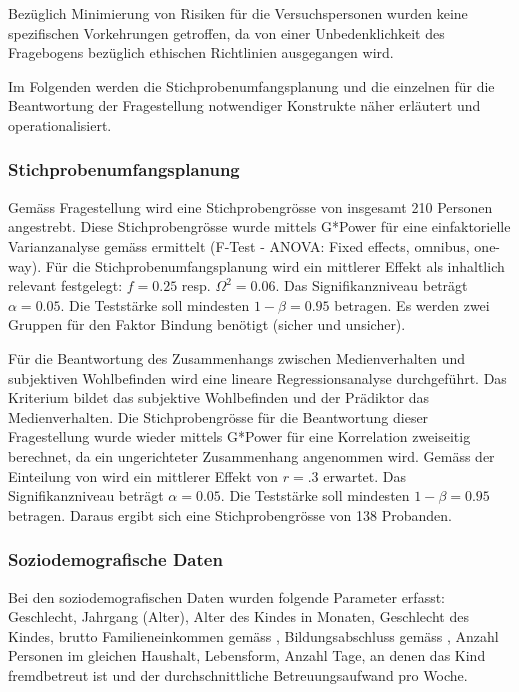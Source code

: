 Bezüglich Minimierung von Risiken für die Versuchspersonen wurden keine spezifischen Vorkehrungen getroffen, da von einer Unbedenklichkeit des Fragebogens bezüglich ethischen Richtlinien ausgegangen wird.

Im Folgenden werden die Stichprobenumfangsplanung und die einzelnen für die Beantwortung der Fragestellung notwendiger Konstrukte näher erläutert und operationalisiert.

\subsubsection{Stichprobenumfangsplanung}\label{sec:Stichprobenumfangsplanung}
Gemäss Fragestellung wird eine Stichprobengrösse von insgesamt 210 Personen angestrebt. Diese Stichprobengrösse wurde mittels G*Power \cite{Faul2009} für eine einfaktorielle Varianzanalyse gemäss  ermittelt (F-Test - ANOVA: Fixed effects, omnibus, one-way).
Für die Stichprobenumfangsplanung wird ein mittlerer Effekt \cite{Cohen1988a} als inhaltlich relevant festgelegt: $f = 0.25$ resp. $\Omega^2 = 0.06$. Das Signifikanzniveau beträgt $\alpha=0.05$. Die Teststärke soll mindesten $1-\beta=0.95$ betragen. Es werden zwei Gruppen für den Faktor Bindung benötigt (sicher und unsicher).

Für die Beantwortung des Zusammenhangs zwischen Medienverhalten und subjektiven Wohlbefinden wird eine lineare Regressionsanalyse durchgeführt. Das Kriterium bildet das subjektive Wohlbefinden und der Prädiktor das Medienverhalten. Die Stichprobengrösse für die Beantwortung dieser Fragestellung wurde wieder mittels G*Power für eine Korrelation zweiseitig berechnet, da ein ungerichteter Zusammenhang angenommen wird. Gemäss der Einteilung von  wird ein mittlerer Effekt von $r=.3$ erwartet. Das Signifikanzniveau beträgt $\alpha=0.05$. Die Teststärke soll mindesten $1-\beta=0.95$ betragen. Daraus ergibt sich eine Stichprobengrösse von 138 Probanden.

\subsubsection{Soziodemografische Daten}\label{sec:SoziodemografischeDaten}
Bei den soziodemografischen Daten wurden folgende Parameter erfasst: Geschlecht, Jahrgang (Alter), Alter des Kindes in Monaten, Geschlecht des Kindes, brutto Familieneinkommen gemäss , Bildungsabschluss gemäss , Anzahl Personen im gleichen Haushalt, Lebensform, Anzahl Tage, an denen das Kind fremdbetreut ist und der durchschnittliche Betreuungsaufwand pro Woche.

